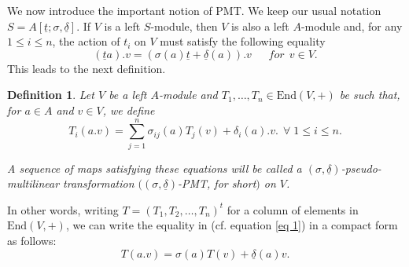 \documentclass[12pt,a4paper]{article}
\newtheorem{definition}[theorem]{Definition}
\newcommand{\de}{\delta}
\newcommand{\si}{\sigma}
\newcommand{\ut}{\underline{t}}
\newcommand{\ud}{\underline{\delta}}
\begin{document}
	\vspace{4mm}
	
	We now introduce the important notion of PMT.
 We keep our usual notation $S=A[\ut;\sigma,\ud]$.
	If $V$ is a left $S$-module,  then $V$ is also a left $A$-module and, for any $1\le i \le n$, the action of $t_i$  on $V$ must satisfy the following equality 
	\begin{equation} 
		(\ut a).v=(\sigma(a)\ut + \ud (a)).v ~~~~~~~ for~~ v \in V.  
	\end{equation}
	This leads to the next definition.
	
	\begin{definition}
	\label{Definition of PMT}
		Let $V$ be a left $A$-module and
		$T_1,\dots,T_n \in \mathrm{End}(V,+)$ be such that, for $a\in A$ and $v\in V$, we define 
		\begin{equation} \label{eq 1}
			 T_i(a.v)=\sum_{j=1}^n \si_{ij}(a)T_j(v) + \de_i(a).v.  ~~\forall \; 1\le i \le n.
		\end{equation}
		
		
		A sequence of maps satisfying these equations will be called a 
		$(\si, \underline{\de})$-pseudo-multilinear transformation $((\si, \underline{\de})$-PMT, for short$)$ on $V$. 
\end{definition}

\vspace{3mm}

In other words, writing $T=(T_1,T_2,\dots, T_n)^t$ for a column of elements in $\mathrm{End}(V,+)$, we can write the equality in (cf. equation \ref{eq 1}) in a compact form as follows:
$$
T(a.v)=\si(a)T(v)+\underline{\de}(a)v.
$$
	
\end{document}
